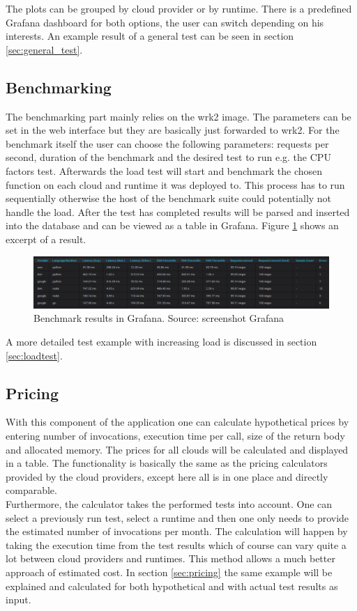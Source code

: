 The plots can be grouped by cloud provider or by runtime. There is a predefined Grafana dashboard for both options, the user can switch depending on his interests. An example result of a general test can be seen in section \ref{sec:general_test}.


\subsection{Benchmarking}
The benchmarking part mainly relies on the wrk2 image. The parameters can be set in the web interface but they are basically just forwarded to wrk2. For the benchmark itself the user can choose the following parameters: requests per second, duration of the benchmark and the desired test to run e.g. the \gls{CPU} factors test. Afterwards the load test will start and benchmark the chosen function on each cloud and runtime it was deployed to. This process has to run sequentially otherwise the host of the benchmark suite could potentially not handle the load. After the test has completed results will be parsed and inserted into the database and can be viewed as a table in Grafana. Figure \ref{fig:benchmark_table} shows an excerpt of a result.

\begin{figure}[htp]
\begin{center}
\includegraphics[width=1\textwidth]{bilder/benchmark_table.png}
\captionsetup{justification=centering, labelfont=bf}
\caption[Benchmark results in Grafana]{Benchmark results in Grafana. Source: screenshot Grafana}
\label{fig:benchmark_table}
\end{center}
\end{figure}

A more detailed test example with increasing load is discussed in section \ref{sec:loadtest}.

\subsection{Pricing}
With this component of the application one can calculate hypothetical prices by entering number of invocations, execution time per call, size of the return body and allocated memory. The prices for all clouds will be calculated and displayed in a table. The functionality is basically the same as the pricing calculators provided by the cloud providers, except here all is in one place and directly comparable.\\
Furthermore, the calculator takes the performed tests into account. One can select a previously run test, select a runtime and then one only needs to provide the estimated number of invocations per month. The calculation will happen by taking the execution time from the test results which of course can vary quite a lot between cloud providers and runtimes. This method allows a much better approach of estimated cost. In section \ref{sec:pricing} the same example will be explained and calculated for both hypothetical and with actual test results as input.
